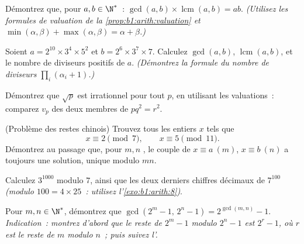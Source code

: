 \begin{exercise}[$\star\star$]\label{exo:b1:arith:5}
Démontrez que, pour $a, b \in \N^*$~: $\gcd(a,b) \times
\operatorname{lcm}(a,b) = ab$. \emph{(Utilisez les formules de valuation de la
\cref{prop:b1:arith:valuation} et $\min(\alpha,\beta) +
\max(\alpha,\beta) = \alpha + \beta$.)}
\end{exercise}

\begin{exercise}[$\star\star$]\label{exo:b1:arith:6}
Soient $a = 2^{10} \times 3^4 \times 5^2$ et $b = 2^6 \times 3^7 \times
7$. Calculez $\gcd(a, b)$, $\operatorname{lcm}(a,b)$, et le nombre de
diviseurs positifs de $a$. \emph{(Démontrez la formule du nombre de diviseurs
$\prod_i (\alpha_i + 1)$.)}
\end{exercise}

\begin{exercise}[$\star\star$]\label{exo:b1:arith:7}
Démontrez que $\sqrt p$ est irrationnel pour tout  $p$, en utilisant
les valuations~: comparez $v_p$ des deux membres de $p q^2 = r^2$.
\end{exercise}

\begin{exercise}[$\star\star$]\label{exo:b1:arith:8}
(Problème des restes chinois) Trouvez tous les entiers $x$ tels que
\[
x \equiv 2 \pmod 7, \qquad x \equiv 5 \pmod{11}.
\]
Démontrez au passage que, pour $m, n$ , le couple de 
$x \equiv a \ (m)$, $x \equiv b\ (n)$ a toujours une solution, unique
modulo $mn$.
\end{exercise}

\begin{exercise}[$\star\star$]\label{exo:b1:arith:9}
Calculez $3^{1000}$ modulo $7$, ainsi que les deux derniers chiffres décimaux de
$7^{100}$ \emph{(modulo $100 = 4 \times 25$~: utilisez
l'\cref{exo:b1:arith:8})}.
\end{exercise}

\begin{exercise}[$\star\star\star$]\label{exo:b1:arith:10}
Pour $m, n \in \N^*$, démontrez que $\gcd(2^m - 1,\, 2^n - 1) =
2^{\gcd(m,n)} - 1$. \emph{Indication~: montrez d'abord que le reste de $2^m
- 1$ modulo $2^n - 1$ est $2^r - 1$, où $r$ est le reste de $m$ modulo
$n$~; puis suivez l'.}
\end{exercise}

